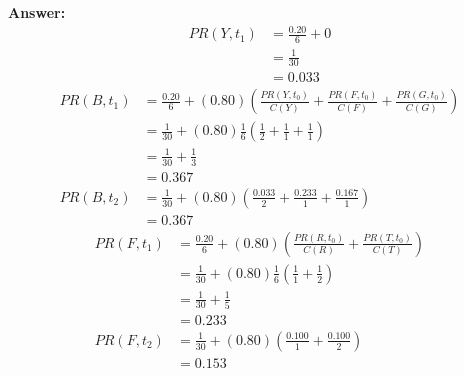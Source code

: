 \documentclass[11pt]{article}
\begin{document}
\begin{enumerate}
\begin{enumerate}
                    \textbf{Answer:}
                    \begin{align*}
                        PR(Y,t_{1}) & = \frac{0.20}{6}+0 \\
                                    & = \frac{1}{30}     \\
                                    & = 0.033
                    \end{align*}
                    \begin{align*}
                        PR(B,t_{1}) & = \frac{0.20}{6}+(0.80)\left(\frac{PR(Y,t_{0})}{C(Y)}+\frac{PR(F,t_{0})}{C(F)}+\frac{PR(G,t_{0})}{C(G)}\right) \\
                                    & = \frac{1}{30}+(0.80)\frac{1}{6}\left(\frac{1}{2}+\frac{1}{1}+\frac{1}{1}\right)                               \\
                                    & = \frac{1}{30}+\frac{1}{3}                                                                                     \\
                                    & = 0.367                                                                                                        \\
                        PR(B,t_{2}) & = \frac{1}{30}+(0.80)\left(\frac{0.033}{2}+\frac{0.233}{1}+\frac{0.167}{1}\right)                              \\
                                    & = 0.367
                    \end{align*}
                    \begin{align*}
                        PR(F,t_{1}) & = \frac{0.20}{6}+(0.80)\left(\frac{PR(R,t_{0})}{C(R)}+\frac{PR(T,t_{0})}{C(T)}\right) \\
                                    & = \frac{1}{30}+(0.80)\frac{1}{6}\left(\frac{1}{1}+\frac{1}{2}\right)                  \\
                                    & = \frac{1}{30}+\frac{1}{5}                                                            \\
                                    & = 0.233                                                                               \\
                        PR(F,t_{2}) & = \frac{1}{30}+(0.80)\left(\frac{0.100}{1}+\frac{0.100}{2}\right)                     \\
                                    & = 0.153
                    \end{align*}

\end{enumerate}
\end{enumerate}
\end{document}
